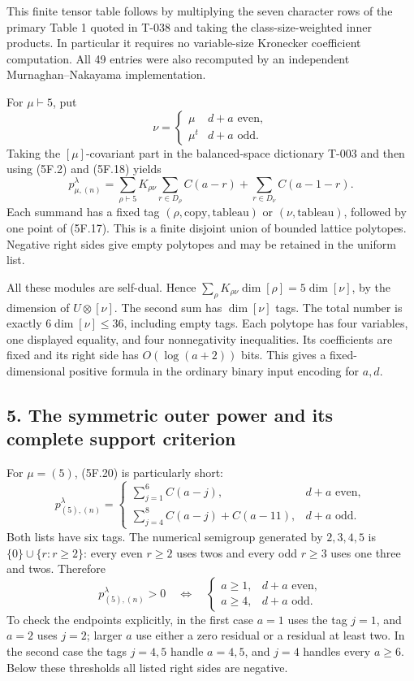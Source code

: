 \documentclass[
  10pt,
]{article}
\begin{document}
This finite tensor table follows by multiplying the seven character rows
of the primary Table 1 quoted in T-038 and taking the
class-size-weighted inner products. In particular it requires no
variable-size Kronecker coefficient computation. All 49 entries were
also recomputed by an independent Murnaghan--Nakayama implementation.

For \(\mu\vdash5\), put \[
\nu=\begin{cases}\mu&d+a\text{ even},\\\mu^t&d+a\text{ odd}.
\end{cases}
\tag{5F.19}
\] Taking the \([\mu]\)-covariant part in the balanced-space dictionary
T-003 and then using (5F.2) and (5F.18) yields \[
\boxed{
p_{\mu,(n)}^\lambda
=\sum_{\rho\vdash5}K_{\rho\nu}
       \sum_{r\in D_\rho}C(a-r)
 +\sum_{r\in D_\nu}C(a-1-r).}
\tag{5F.20}
\] Each summand has a fixed tag \((\rho,\text{copy},\text{tableau})\) or
\((\nu,\text{tableau})\), followed by one point of (5F.17). This is a
finite disjoint union of bounded lattice polytopes. Negative right sides
give empty polytopes and may be retained in the uniform list.

All these modules are self-dual. Hence
\(\sum_\rho K_{\rho\nu}\dim[\rho]=5\dim[\nu]\), by the dimension of
\(U\otimes[\nu]\). The second sum has \(\dim[\nu]\) tags. The total
number is exactly \(6\dim[\nu]\le36\), including empty tags. Each
polytope has four variables, one displayed equality, and four
nonnegativity inequalities. Its coefficients are fixed and its right
side has \(O(\log(a+2))\) bits. This gives a fixed-dimensional positive
formula in the ordinary binary input encoding for \(a,d\).

\subsection{5. The symmetric outer power and its complete support
criterion}\label{the-symmetric-outer-power-and-its-complete-support-criterion}

For \(\mu=(5)\), (5F.20) is particularly short: \[
\boxed{
p_{(5),(n)}^\lambda=
\begin{cases}
\displaystyle\sum_{j=1}^{6}C(a-j),&d+a\text{ even},\\[2mm]
\displaystyle\sum_{j=4}^{8}C(a-j)+C(a-11),&d+a\text{ odd}.
\end{cases}}
\tag{5F.21}
\] Both lists have six tags. The numerical semigroup generated by
\(2,3,4,5\) is \(\{0\}\cup\{r:r\ge2\}\): every even \(r\ge2\) uses twos
and every odd \(r\ge3\) uses one three and twos. Therefore \[
\boxed{
p_{(5),(n)}^\lambda>0
\quad\Longleftrightarrow\quad
\begin{cases}
a\ge1,&d+a\text{ even},\\
a\ge4,&d+a\text{ odd}.
\end{cases}}
\tag{5F.22}
\] To check the endpoints explicitly, in the first case \(a=1\) uses the
tag \(j=1\), and \(a=2\) uses \(j=2\); larger \(a\) use either a zero
residual or a residual at least two. In the second case the tags
\(j=4,5\) handle \(a=4,5\), and \(j=4\) handles every \(a\ge6\). Below
these thresholds all listed right sides are negative.
\end{document}
